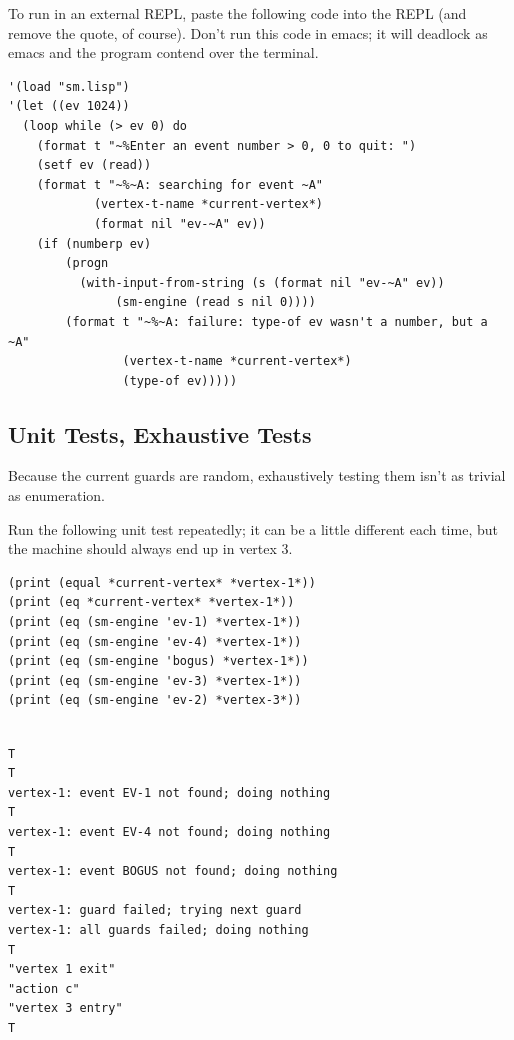 \documentclass[10pt,oneside,x11names]{article}
\begin{document}
To run in an external REPL, paste the following code into the REPL (and
remove the quote, of course). Don't run this code in emacs; it will deadlock
as emacs and the program contend over the terminal.

\begin{verbatim}
'(load "sm.lisp")
'(let ((ev 1024))
  (loop while (> ev 0) do
    (format t "~%Enter an event number > 0, 0 to quit: ")
    (setf ev (read))
    (format t "~%~A: searching for event ~A"
            (vertex-t-name *current-vertex*)
            (format nil "ev-~A" ev))
    (if (numberp ev)
        (progn
          (with-input-from-string (s (format nil "ev-~A" ev))
               (sm-engine (read s nil 0))))
        (format t "~%~A: failure: type-of ev wasn't a number, but a ~A"
                (vertex-t-name *current-vertex*)
                (type-of ev)))))

\end{verbatim}

\subsection{Unit Tests, Exhaustive Tests}
\label{sec:org5cb2a3f}

Because the current guards are random, exhaustively testing them isn't as
trivial as enumeration.

Run the following unit test repeatedly; it can be a little different each
time, but the machine should always end up in vertex 3.

\begin{verbatim}
(print (equal *current-vertex* *vertex-1*))
(print (eq *current-vertex* *vertex-1*))
(print (eq (sm-engine 'ev-1) *vertex-1*))
(print (eq (sm-engine 'ev-4) *vertex-1*))
(print (eq (sm-engine 'bogus) *vertex-1*))
(print (eq (sm-engine 'ev-3) *vertex-1*))
(print (eq (sm-engine 'ev-2) *vertex-3*))
\end{verbatim}

\begin{verbatim}

T
T
vertex-1: event EV-1 not found; doing nothing
T
vertex-1: event EV-4 not found; doing nothing
T
vertex-1: event BOGUS not found; doing nothing
T
vertex-1: guard failed; trying next guard
vertex-1: all guards failed; doing nothing
T
"vertex 1 exit"
"action c"
"vertex 3 entry"
T
\end{verbatim}
\end{document}

